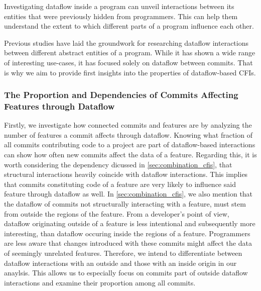 Investigating dataflow inside a program can unveil interactions between its entities that were previously hidden from programmers.
This can help them understand the extent to which different parts of a program influence each other.

Previous studies have laid the groundwork for researching dataflow interactions between different abstract entities of a program.
While it has shown a wide range of interesting use-cases, it has focused solely on dataflow between commits.
That is why we aim to provide first insights into the properties of dataflow-based CFIs.

\subsubsection*{The Proportion and Dependencies of Commits Affecting Features through Dataflow}

Firstly, we investigate how connected commits and features are by analyzing the number of features a commit affects through dataflow.
Knowing what fraction of all commits contributing code to a project are part of dataflow-based interactions can show how often new commits affect the data of a feature. 
Regarding this, it is worth considering the dependency dicussed in \autoref{sec:combination_cfis}, that structural interactions heavily coincide with dataflow interactions.
This implies that commits constituting code of a feature are very likely to influence said feature through dataflow as well.
In \autoref{sec:combination_cfis}, we also mention that the dataflow of commits not structurally interacting with a feature, must stem from outside the regions of the feature. 
From a developer's point of view, dataflow originating outside of a feature is less intentional and subsequently more interesting, than dataflow occuring inside the regions of a feature. 
Programmers are less aware that changes introduced with these commits might affect the data of seemingly unrelated features.
Therefore, we intend to differentiate between dataflow interactions with an outside and those with an inside origin in our anaylsis.
This allows us to especially focus on commits part of outside dataflow interactions and examine their proportion among all commits. 

